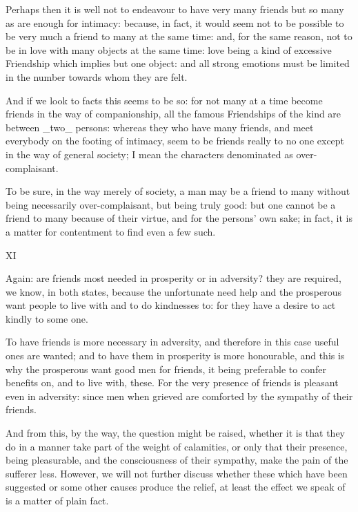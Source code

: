 Perhaps then it is well not to endeavour to have very many friends but
so many as are enough for intimacy: because, in fact, it would seem not
to be possible to be very much a friend to many at the same time: and,
for the same reason, not to be in love with many objects at the same
time: love being a kind of excessive Friendship which implies but one
object: and all strong emotions must be limited in the number towards
whom they are felt.

And if we look to facts this seems to be so: for not many at a time
become friends in the way of companionship, all the famous Friendships
of the kind are between _two_ persons: whereas they who have many
friends, and meet everybody on the footing of intimacy, seem to be
friends really to no one except in the way of general society; I mean
the characters denominated as over-complaisant.

To be sure, in the way merely of society, a man may be a friend to many
without being necessarily over-complaisant, but being truly good: but
one cannot be a friend to many because of their virtue, and for the
persons' own sake; in fact, it is a matter for contentment to find even
a few such.


XI

Again: are friends most needed in prosperity or in adversity? they are
required, we know, in both states, because the unfortunate need help and
the prosperous want people to live with and to do kindnesses to: for
they have a desire to act kindly to some one.

To have friends is more necessary in adversity, and therefore in this
case useful ones are wanted; and to have them in prosperity is more
honourable, and this is why the prosperous want good men for friends, it
being preferable to confer benefits on, and to live with, these. For the
very presence of friends is pleasant even in adversity: since men when
grieved are comforted by the sympathy of their friends.

And from this, by the way, the question might be raised, whether it is
that they do in a manner take part of the weight of calamities, or only
that their presence, being pleasurable, and the consciousness of their
sympathy, make the pain of the sufferer less. However, we will not
further discuss whether these which have been suggested or some other
causes produce the relief, at least the effect we speak of is a matter
of plain fact.

